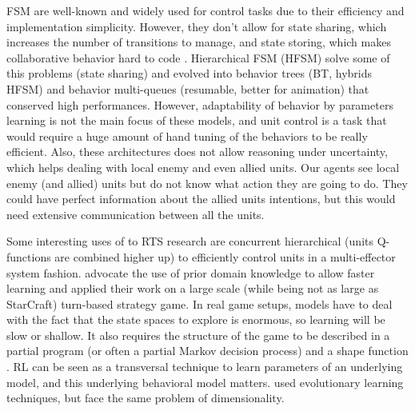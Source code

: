 FSM are well-known and widely used for control tasks due to their efficiency and implementation simplicity. However, they don't allow for state sharing, which increases the number of transitions to manage, and state storing, which makes collaborative behavior hard to code \citep{Cutumisu09}. Hierarchical FSM (HFSM) solve some of this problems (state sharing) and evolved into behavior trees (BT, hybrids HFSM) \citep{Isla} and behavior multi-queues (resumable, better for animation) \citep{Cutumisu09} that conserved high performances. %
However, adaptability of behavior by parameters learning is not the main focus of these models, and unit control is a task that would require a huge amount of hand tuning of the behaviors to be really efficient. 
Also, these architectures does not allow reasoning under uncertainty, which helps dealing with local enemy and even allied units. Our agents see local enemy (and allied) units but do not know what action they are going to do. They could have perfect information about the allied units intentions, but this would need extensive communication between all the units.

Some interesting uses of  \citep{Sutton} to RTS research are concurrent hierarchical (units Q-functions are combined higher up)  \citep{Marthi05concurrenthierarchical} to efficiently control units in a multi-effector system fashion. \cite{Madeira06} advocate the use of prior domain knowledge to allow faster  learning and applied their work on a large scale (while being not as large as StarCraft) turn-based strategy game. In real game setups,  models have to deal with the fact that the state spaces to explore is enormous, so learning will be slow or shallow. It also requires the structure of the game to be described in a partial program (or often a partial Markov decision process) and a shape function \citep{Marthi05concurrenthierarchical}. RL can be seen as a transversal technique to learn parameters of an underlying model, and this underlying behavioral model matters. \cite{GA} used evolutionary learning techniques, but face the same problem of dimensionality. 

